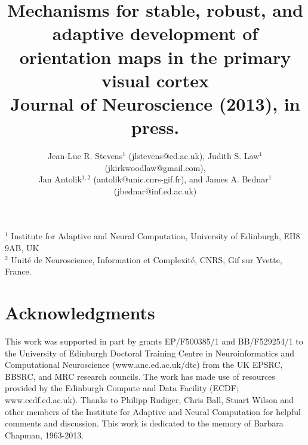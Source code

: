\documentclass{article}
\begin{document}
\begin{titlepage}


\title{Mechanisms for stable, robust, and adaptive development of
  orientation maps in the primary visual cortex\\
{\large Journal of Neuroscience (2013), in press.}
}
\author{Jean-Luc R. Stevens$^1$ (jlstevens@ed.ac.uk), Judith S. Law$^1$ (jkirkwoodlaw@gmail.com),\\
Jan Antolik$^{1,2}$ (antolik@unic.cnrs-gif.fr), and James A. Bednar$^1$ (jbednar@inf.ed.ac.uk)}
\maketitle

\noindent
$^1$ Institute for Adaptive and Neural Computation, University of Edinburgh, EH8 9AB, UK\\
$^2$ Unit{\'e} de Neuroscience, Information et Complexit{\'e}, CNRS, Gif sur Yvette, France.\\

\noindent


\section*{Acknowledgments}
This work was supported in part by grants EP/F500385/1 and
BB/F529254/1 to the University of Edinburgh Doctoral Training Centre
in Neuroinformatics and Computational Neuroscience (www.anc.ed.ac.uk/dtc)
from the UK EPSRC, BBSRC, and MRC research councils.  The work has
made use of resources provided by the Edinburgh Compute and Data
Facility (ECDF; www.ecdf.ed.ac.uk).  Thanks to Philipp Rudiger, Chris
Ball, Stuart Wilson and other members of the Institute for Adaptive
and Neural Computation for helpful comments and discussion. This work
is dedicated to the memory of Barbara Chapman, 1963-2013.

\end{titlepage}
\end{document}
